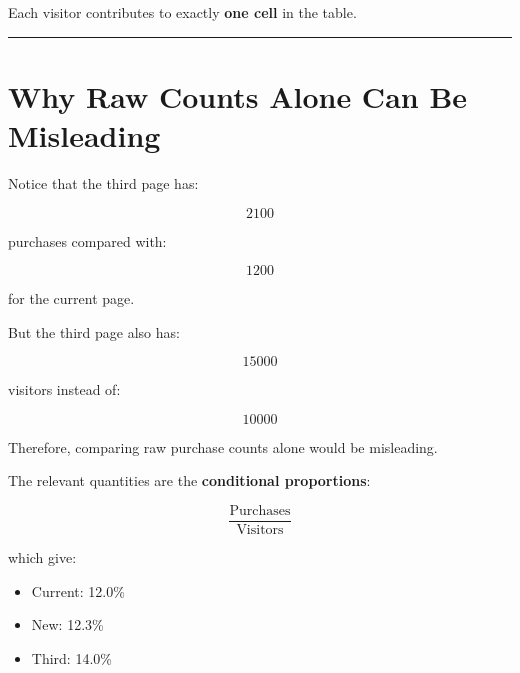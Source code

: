 \documentclass[
  letterpaper,
  DIV=11,
  numbers=noendperiod]{scrreprt}
\newenvironment{Shaded}{\begin{snugshade}}{\end{snugshade}}
\newcommand{\AttributeTok}[1]{\textcolor[rgb]{0.40,0.45,0.13}{#1}}
\newcommand{\FunctionTok}[1]{\textcolor[rgb]{0.28,0.35,0.67}{#1}}
\newcommand{\NormalTok}[1]{\textcolor[rgb]{0.00,0.23,0.31}{#1}}
\newcommand{\OtherTok}[1]{\textcolor[rgb]{0.00,0.23,0.31}{#1}}
\newcommand{\SpecialCharTok}[1]{\textcolor[rgb]{0.37,0.37,0.37}{#1}}
\newcommand{\StringTok}[1]{\textcolor[rgb]{0.13,0.47,0.30}{#1}}
\providecommand{\tightlist}{%
  \setlength{\itemsep}{0pt}\setlength{\parskip}{0pt}}
\begin{document}
\begin{Shaded}
\end{Shaded}

Each visitor contributes to exactly \textbf{one cell} in the table.

\begin{center}\rule{0.5\linewidth}{0.5pt}\end{center}


\chapter{Why Raw Counts Alone Can Be
Misleading}\label{why-raw-counts-alone-can-be-misleading}

Notice that the third page has:

\[
2100
\]

purchases compared with:

\[
1200
\]

for the current page.

But the third page also has:

\[
15000
\]

visitors instead of:

\[
10000
\]

Therefore, comparing raw purchase counts alone would be misleading.

The relevant quantities are the \textbf{conditional proportions}:

\[
\frac{\text{Purchases}}{\text{Visitors}}
\]

which give:

\begin{itemize}
\tightlist
\item
  Current: 12.0\%
\item
  New: 12.3\%
\item
  Third: 14.0\%
\end{itemize}
\end{document}
